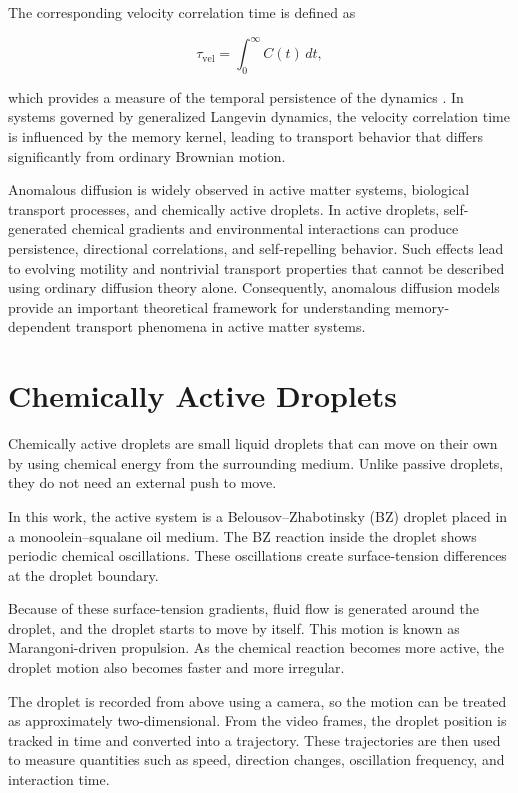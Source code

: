The corresponding velocity correlation time is defined as\cite{balakrishnan2021}

\begin{equation}
\tau_{\mathrm{vel}}
=
\int_0^\infty
C(t)\,dt,
\end{equation}

which provides a measure of the temporal persistence of the dynamics \cite{balakrishnan2021}. In systems governed by generalized Langevin dynamics, the velocity correlation time is influenced by the memory kernel, leading to transport behavior that differs significantly from ordinary Brownian motion.

Anomalous diffusion is widely observed in active matter systems, biological transport processes, and chemically active droplets. In active droplets, self-generated chemical gradients and environmental interactions can produce persistence, directional correlations, and self-repelling behavior. Such effects lead to evolving motility and nontrivial transport properties that cannot be described using ordinary diffusion theory alone. Consequently, anomalous diffusion models provide an important theoretical framework for understanding memory-dependent transport phenomena in active matter systems.
\section{Chemically Active Droplets}

Chemically active droplets\cite{izzet2020,vrugt2025} are small liquid droplets that can move on their own by using chemical energy from the surrounding medium. Unlike passive droplets, they do not need an external push to move.

In this work, the active system is a Belousov--Zhabotinsky (BZ) droplet\cite{FastMoving2021article,Shajahan2026} placed in a monoolein--squalane oil medium. The BZ reaction inside the droplet shows periodic chemical oscillations. These oscillations create surface-tension differences at the droplet boundary.

Because of these surface-tension gradients, fluid flow is generated around the droplet, and the droplet starts to move by itself. This motion is known as Marangoni-driven propulsion\cite{izzet2020,FastMoving2021article}. As the chemical reaction becomes more active, the droplet motion also becomes faster and more irregular.

The droplet is recorded from above using a camera, so the motion can be treated as approximately two-dimensional. From the video frames, the droplet position is tracked in time and converted into a trajectory. These trajectories are then used to measure quantities such as speed, direction changes, oscillation frequency, and interaction time.

